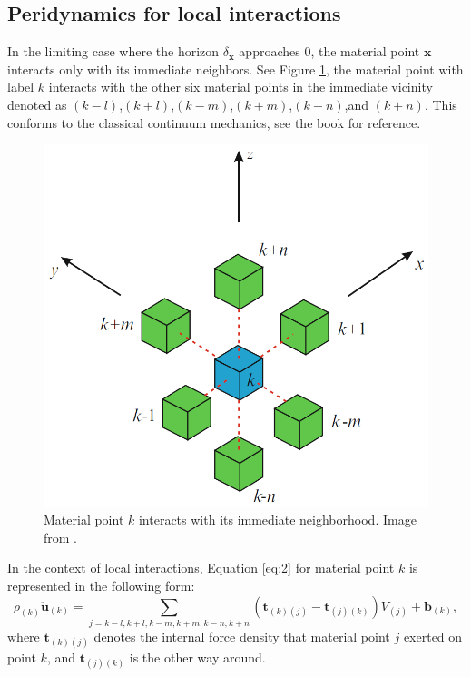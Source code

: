 \documentclass[11pt,fullpage]{article}
\newcommand{\mb}[1]{\mathbf{#1}}
\newcommand{\blue}[1]{#1}
\begin{document}
\subsection{Peridynamics for local interactions}

In the limiting case where the horizon $\delta_\mb{x}$ approaches 0, the material point $\mb{x}$ interacts only with its immediate neighbors. See Figure \blue{\ref{fig:1}}, the material point with label $k$ interacts with the other six material points in the immediate vicinity denoted as $(k-l)$,$(k+l)$,$(k-m)$,$(k+m)$,$(k-n)$,and $(k+n)$. This conforms to the classical continuum mechanics, see the book \blue{\cite{bonet2008nonlinear}} for reference.
\begin{figure}[h]
  \centering
  \includegraphics[width=0.5\linewidth]{./fig1.png}
  \caption{\label{fig:1}
  Material point $k$ interacts with its immediate neighborhood. Image from \blue{\cite{madenci2014peridynamic}}.
}
\end{figure}

In the context of local interactions, Equation \blue{\ref{eq:2}} for material point $k$ is represented in the following form:
\begin{equation}
\rho_{(k)}\ddot{\mb{u}}_{(k)} = \sum_{j=k-l,k+l,k-m,k+m,k-n,k+n}(\mb{t}_{(k)(j)}-\mb{t}_{(j)(k)})V_{(j)} + \mb{b}_{(k)},
\label{eq:3}
\end{equation}
where $\mb{t}_{(k)(j)}$ denotes the internal force density that material point $j$ exerted on point $k$, and $\mb{t}_{(j)(k)}$ is the other way around.
\end{document}
